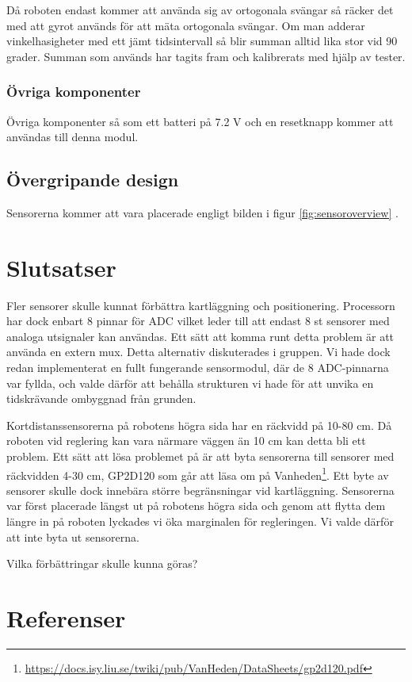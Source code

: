 \documentclass[a4paper,12pt,fleqn]{article}
\begin{document}
Då roboten endast kommer att använda sig av ortogonala svängar så räcker det med att gyrot används för att mäta ortogonala svängar. Om man adderar vinkelhasigheter med ett jämt tidsintervall så blir summan alltid lika stor vid 90 grader.
Summan som används har tagits fram och kalibrerats med hjälp av tester.

\subsubsection{Övriga komponenter}
Övriga komponenter så som ett batteri på 7.2 V och en resetknapp kommer att användas till denna modul.

\subsection{Övergripande design}
Sensorerna kommer att vara placerade engligt bilden i figur \ref{fig:sensoroverview} .

\section{Slutsatser}
Fler sensorer skulle kunnat förbättra kartläggning och positionering. Processorn har dock enbart 8 pinnar för ADC vilket leder till att endast 8 st sensorer med analoga utsignaler kan användas. Ett sätt att komma runt detta problem är att använda en extern mux.
Detta alternativ diskuterades i gruppen. Vi hade dock redan implementerat en fullt fungerande sensormodul, där de 8 ADC-pinnarna var fyllda, och valde därför att behålla strukturen vi hade för att unvika en tidskrävande ombyggnad från grunden.

Kortdistanssensorerna på robotens högra sida har en räckvidd på 10-80 cm. Då roboten vid reglering kan vara närmare väggen än 10 cm kan detta bli ett problem. Ett sätt att lösa problemet på är att byta sensorerna till sensorer med räckvidden 4-30 cm, 
GP2D120 som går att läsa om på Vanheden\footnote{\url{https://docs.isy.liu.se/twiki/pub/VanHeden/DataSheets/gp2d120.pdf}}. Ett byte av sensorer skulle dock innebära större begränsningar vid kartläggning.
Sensorerna var först placerade längst ut på robotens högra sida och genom att flytta dem längre in på roboten lyckades vi öka marginalen för regleringen. Vi valde därför att inte byta ut sensorerna.

Vilka förbättringar skulle kunna göras?

\section{Referenser}
\end{document}
